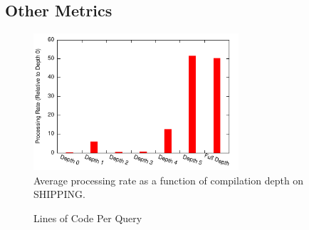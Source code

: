 \subsection{Other Metrics}
\begin{figure}
\begin{center}
\includegraphics[width=3in]{../graphs/graphs/depth_ssb4.pdf}
\caption{Average processing rate as a function of compilation depth on SHIPPING.}
\label{fig:experiments:ssb4depth}
\end{center}
\end{figure}


\begin{figure}
\begin{center}

\caption{Lines of Code Per Query}
\label{fig:experiments:loc}
\end{center}
\end{figure}